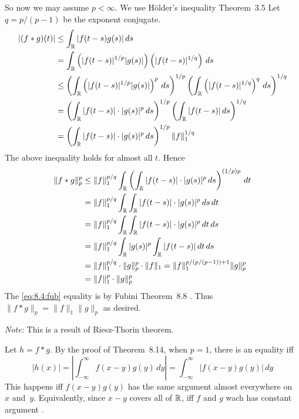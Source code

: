 \begin{enumerate}
\begin{itemize}
So now we may assume \(p<\infty\). We use 
 H\"older's inequality 
Theorem~3.5 \cite{RudinRCA87}
Let \(q = p / (p - 1)\) be the exponent conjugate.
\begin{align}
|(f \ast g)(t)|
&\leq \int_{\mathbb{R}} |f(t-s)g(s)|\,ds \notag \\
&= \int_{\mathbb{R}} 
    \left(|f(t-s)|^{1/p} |g(s)|\right) 
    \left(|f(t-s)|^{1/q}\right) 
    \,ds \notag \\
&\leq \label{eq:ex8.4a:holder}
      \left( \int_{\mathbb{R}} \left(|f(t-s)|^{1/p} |g(s)|\right)^p\,ds \right)^{1/p}
      \left( \int_{\mathbb{R}} \left(|f(t-s)|^{1/q}\right)^q \,ds \right)^{1/q} \\
&=   \left( \int_{\mathbb{R}} |f(t-s)| \cdot |g(s)|^p\,ds \right)^{1/p}
      \left( \int_{\mathbb{R}} |f(t-s)| \,ds \right)^{1/q} \notag \\
&=   \left( \int_{\mathbb{R}} |f(t-s)| \cdot |g(s)|^p\,ds \right)^{1/p} \|f\|_1^{1/q}
     \notag
\end{align}
The above inequality holds for almost all $t$. Hence
\begin{align}
\|f \ast g\|_p^p
&\leq \|f\|_1^{p/q} \notag
      \int_{\mathbb{R}} 
        \left(\int_{\mathbb{R}} |f(t-s)| \cdot |g(s)|^p\,ds \right)^{(1/p)p}\,dt \\
&= \|f\|_1^{p/q} \notag
   \int_{\mathbb{R}} \int_{\mathbb{R}} |f(t-s)| \cdot |g(s)|^p\,ds\,dt \\
&= \|f\|_1^{p/q} \label{eq:8.4:fub}
   \int_{\mathbb{R}} \int_{\mathbb{R}} |f(t-s)| \cdot |g(s)|^p\,dt\,ds \\
&= \|f\|_1^{p/q} \notag
   \int_{\mathbb{R}} |g(s)|^p \int_{\mathbb{R}} |f(t-s)| \,dt\,ds \\
&= \|f\|_1^{p/q} \cdot \|g\|_p^p \cdot \|f\|_1  \notag
 = \|f\|_1^{p/(p/(p-1)) + 1}  \|g\|_p^p \\
&=  \|f\|_1^p \cdot \|g\|_p^p  \notag
\end{align}
The \eqref{eq:8.4:fub} equality is by Fubini Theorem~8.8 \cite{RudinRCA87}.
Thus \(\|f \ast g\|_p =  \|f\|_1 \|g\|_p\) as desired.

\emph{Note:} This is a result of 
Riesz-Thorin theorem.

Let \(h = f\ast g\).
By the proof of Theorem~8.14, when \(p=1\), there is an equality iff
\begin{equation*}
|h(x)| 
= \left|\int_{-\infty}^\infty f(x-y)g(y)\,dy\right|
= \int_{-\infty}^\infty |f(x-y)g(y)|\,dy
\end{equation*}
This happens iff \(f(x-y)g(y)\) 
has the same argument almost everywhere on~$x$ and~$y$.
Equivalently, since \(x-y\) covers all of \(\mathbb{R}\), iff
$f$ and $g$ wach has constant argument \aded.


\end{itemize}
\end{enumerate}
